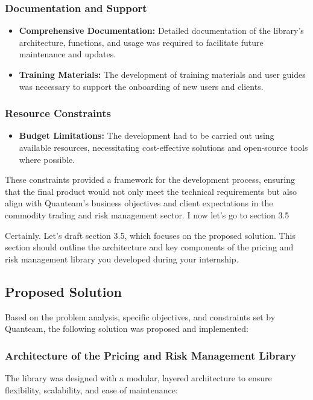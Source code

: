 \documentclass[12pt]{article}
\begin{document}
\subsubsection{Documentation and Support}
\begin{itemize}
\item \textbf{Comprehensive Documentation:} Detailed documentation of the library's architecture, functions, and usage was required to facilitate future maintenance and updates.
\item \textbf{Training Materials:} The development of training materials and user guides was necessary to support the onboarding of new users and clients.
\end{itemize}
\subsubsection{Resource Constraints}
\begin{itemize}
\item \textbf{Budget Limitations:} The development had to be carried out using available resources, necessitating cost-effective solutions and open-source tools where possible.
\end{itemize}
These constraints provided a framework for the development process, ensuring that the final product would not only meet the technical requirements but also align with Quanteam's business objectives and client expectations in the commodity trading and risk management sector.
I
now let's go to section 3.5


Certainly. Let's draft section 3.5, which focuses on the proposed solution. This section should outline the architecture and key components of the pricing and risk management library you developed during your internship.

\subsection{Proposed Solution}

Based on the problem analysis, specific objectives, and constraints set by Quanteam, the following solution was proposed and implemented:

\subsubsection{Architecture of the Pricing and Risk Management Library}

The library was designed with a modular, layered architecture to ensure flexibility, scalability, and ease of maintenance:
\end{document}
